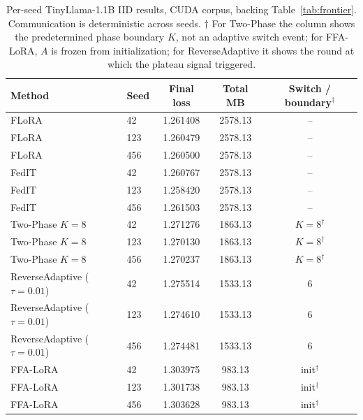 \begin{table}[H]
\caption{Per-seed TinyLlama-1.1B IID results, CUDA corpus, backing Table~\ref{tab:frontier}. Communication is deterministic across seeds. $\dagger$ For Two-Phase the column shows the predetermined phase boundary $K$, not an adaptive switch event; for FFA-LoRA, $A$ is frozen from initialization; for ReverseAdaptive it shows the round at which the plateau signal triggered.}
\label{tab:b1}
\begin{center}
\small
\setlength{\tabcolsep}{4pt}
\begin{tabular}{llccc}
\toprule
Method & Seed & Final loss & Total MB & Switch / boundary$^\dagger$ \\
\midrule
FLoRA & 42 & 1.261408 & 2578.13 & -- \\
FLoRA & 123 & 1.260479 & 2578.13 & -- \\
FLoRA & 456 & 1.260500 & 2578.13 & -- \\
FedIT & 42 & 1.260767 & 2578.13 & -- \\
FedIT & 123 & 1.258420 & 2578.13 & -- \\
FedIT & 456 & 1.261503 & 2578.13 & -- \\
Two-Phase $K{=}8$ & 42 & 1.271276 & 1863.13 & $K{=}8^\dagger$ \\
Two-Phase $K{=}8$ & 123 & 1.270130 & 1863.13 & $K{=}8^\dagger$ \\
Two-Phase $K{=}8$ & 456 & 1.270237 & 1863.13 & $K{=}8^\dagger$ \\
ReverseAdaptive ($\tau{=}0.01$) & 42 & 1.275514 & 1533.13 & 6 \\
ReverseAdaptive ($\tau{=}0.01$) & 123 & 1.274610 & 1533.13 & 6 \\
ReverseAdaptive ($\tau{=}0.01$) & 456 & 1.274481 & 1533.13 & 6 \\
FFA-LoRA & 42 & 1.303975 & \phantom{0}983.13 & init$^\dagger$ \\
FFA-LoRA & 123 & 1.301738 & \phantom{0}983.13 & init$^\dagger$ \\
FFA-LoRA & 456 & 1.303628 & \phantom{0}983.13 & init$^\dagger$ \\
\bottomrule
\end{tabular}
\end{center}
\end{table}

